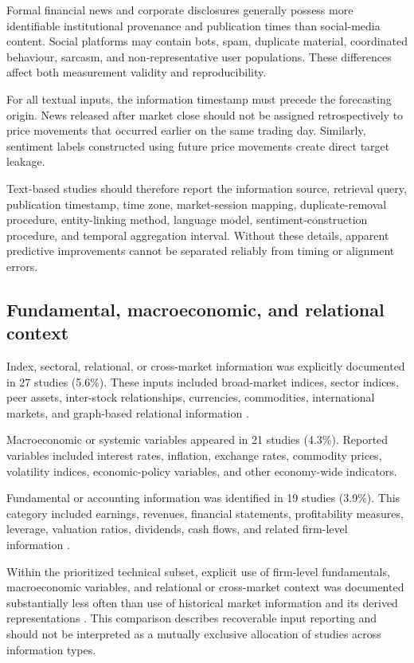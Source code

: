 \documentclass[pdflatex,sn-mathphys-num]{sn-jnl}%
\theoremstyle{thmstyleone}%
\theoremstyle{thmstyletwo}%
\theoremstyle{thmstylethree}%
\begin{document}
Formal financial news and corporate disclosures generally possess
more identifiable institutional provenance and publication times than
social-media content. Social platforms may contain bots, spam,
duplicate material, coordinated behaviour, sarcasm, and
non-representative user populations. These differences affect both
measurement validity and reproducibility.

For all textual inputs, the information timestamp must precede the
forecasting origin. News released after market close should not be
assigned retrospectively to price movements that occurred earlier on
the same trading day. Similarly, sentiment labels constructed using
future price movements create direct target leakage.

Text-based studies should therefore report the information source,
retrieval query, publication timestamp, time zone, market-session
mapping, duplicate-removal procedure, entity-linking method, language
model, sentiment-construction procedure, and temporal aggregation
interval. Without these details, apparent predictive improvements
cannot be separated reliably from timing or alignment errors.

\subsection{Fundamental, macroeconomic, and relational context}
\label{subsec:contextual-inputs}

Index, sectoral, relational, or cross-market information was
explicitly documented in 27 studies (5.6\%). These inputs included
broad-market indices, sector indices, peer assets, inter-stock
relationships, currencies, commodities, international markets, and
graph-based relational information \cite{P00260,P00390,P00544,P00625}.

Macroeconomic or systemic variables appeared in 21 studies (4.3\%).
Reported variables included interest rates, inflation, exchange rates,
commodity prices, volatility indices, economic-policy variables, and
other economy-wide indicators.

Fundamental or accounting information was identified in 19 studies
(3.9\%). This category included earnings, revenues, financial
statements, profitability measures, leverage, valuation ratios,
dividends, cash flows, and related firm-level information \cite{P00260,P00390,P00544,P00625}.

Within the prioritized technical subset, explicit use of firm-level
fundamentals, macroeconomic variables, and relational or cross-market
context was documented substantially less often than use of historical
market information and its derived representations \cite{P00186,P00248,P00727,P01732}. This comparison
describes recoverable input reporting and should not be interpreted as
a mutually exclusive allocation of studies across information types.
\end{document}
